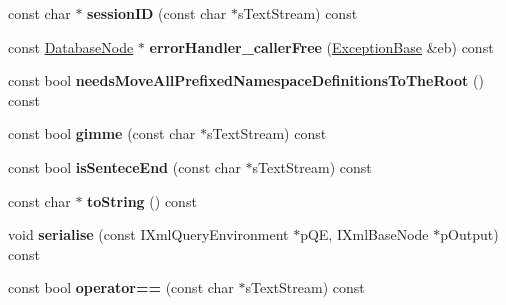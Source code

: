 \begin{DoxyCompactItemize}
\item 
\hypertarget{classgeneral__server_1_1MessageInterpretation_a7a9f2498a0e166c6949185c9b00a33d1}{const char $\ast$ {\bfseries session\-I\-D} (const char $\ast$s\-Text\-Stream) const }\label{classgeneral__server_1_1MessageInterpretation_a7a9f2498a0e166c6949185c9b00a33d1}

\item 
\hypertarget{classgeneral__server_1_1MessageInterpretation_ac5f3f67fe549a961cca3887652e04fc9}{const \hyperlink{classgeneral__server_1_1DatabaseNode}{\-Database\-Node} $\ast$ {\bfseries error\-Handler\-\_\-caller\-Free} (\hyperlink{classgeneral__server_1_1ExceptionBase}{\-Exception\-Base} \&eb) const }\label{classgeneral__server_1_1MessageInterpretation_ac5f3f67fe549a961cca3887652e04fc9}

\item 
\hypertarget{classgeneral__server_1_1MessageInterpretation_aaf50275f315e2ad580bded309d5569e4}{const bool {\bfseries needs\-Move\-All\-Prefixed\-Namespace\-Definitions\-To\-The\-Root} () const }\label{classgeneral__server_1_1MessageInterpretation_aaf50275f315e2ad580bded309d5569e4}

\item 
\hypertarget{classgeneral__server_1_1MessageInterpretation_a5b32b5eaf54c0363ec94f60e7ca934ed}{const bool {\bfseries gimme} (const char $\ast$s\-Text\-Stream) const }\label{classgeneral__server_1_1MessageInterpretation_a5b32b5eaf54c0363ec94f60e7ca934ed}

\item 
\hypertarget{classgeneral__server_1_1MessageInterpretation_a4c182aa0ae2d51d20fa7f4ec6f5e5295}{const bool {\bfseries is\-Sentece\-End} (const char $\ast$s\-Text\-Stream) const }\label{classgeneral__server_1_1MessageInterpretation_a4c182aa0ae2d51d20fa7f4ec6f5e5295}

\item 
\hypertarget{classgeneral__server_1_1MessageInterpretation_a2eb760a2782d153ea9d15b2cbb7e1a29}{const char $\ast$ {\bfseries to\-String} () const }\label{classgeneral__server_1_1MessageInterpretation_a2eb760a2782d153ea9d15b2cbb7e1a29}

\item 
\hypertarget{classgeneral__server_1_1MessageInterpretation_afde630a1b71679a0b2e0a66a836f8592}{void {\bfseries serialise} (const \-I\-Xml\-Query\-Environment $\ast$p\-Q\-E, \-I\-Xml\-Base\-Node $\ast$p\-Output) const }\label{classgeneral__server_1_1MessageInterpretation_afde630a1b71679a0b2e0a66a836f8592}

\item 
\hypertarget{classgeneral__server_1_1MessageInterpretation_a38dafbc5da41a1b7a0ec60257750309e}{const bool {\bfseries operator==} (const char $\ast$s\-Text\-Stream) const }\label{classgeneral__server_1_1MessageInterpretation_a38dafbc5da41a1b7a0ec60257750309e}

\end{DoxyCompactItemize}
